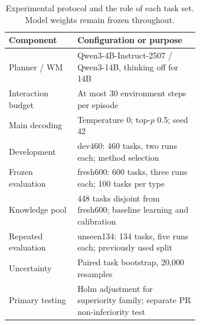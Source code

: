 \begin{table}[tbp]
\caption{Experimental protocol and the role of each task set. Model weights remain frozen throughout.}
\label{tab:protocol}\centering
\begin{tabular}{lp{0.64\linewidth}}\toprule
Component & Configuration or purpose\\\midrule
Planner / WM & Qwen3-4B-Instruct-2507 / Qwen3-14B, thinking off for 14B\\
Interaction budget & At most 30 environment steps per episode\\
Main decoding & Temperature 0; top-$p$ 0.5; seed 42\\
Development & dev460: 460 tasks, two runs each; method selection\\
Frozen evaluation & fresh600: 600 tasks, three runs each; 100 tasks per type\\
Knowledge pool & 448 tasks disjoint from fresh600; baseline learning and calibration\\
Repeated evaluation & unseen134: 134 tasks, five runs each; previously used split\\
Uncertainty & Paired task bootstrap, 20,000 resamples\\
Primary testing & Holm adjustment for superiority family; separate PR non-inferiority test\\\bottomrule
\end{tabular}
\end{table}
